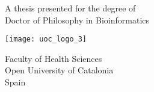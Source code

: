 
\begin{titlepage}
    \begin{center}
        \vspace*{1.5cm}
        
        \Huge
        \textbf{\thetitle}
        \vspace{2cm}
        \LARGE
        
        \textbf{\theauthor}
        
        \vfill
        
        A thesis presented for the degree of\\
        Doctor of Philosophy in Bioinformatics
        
        \vfill
                
        \texttt{[image: uoc\_logo\_3]}
        
        \vspace{0.5cm}
        
        \Large
        Faculty of Health Sciences\\
        Open University of Catalonia\\
        Spain\\
        \thedate
        
    \end{center}
\end{titlepage}
